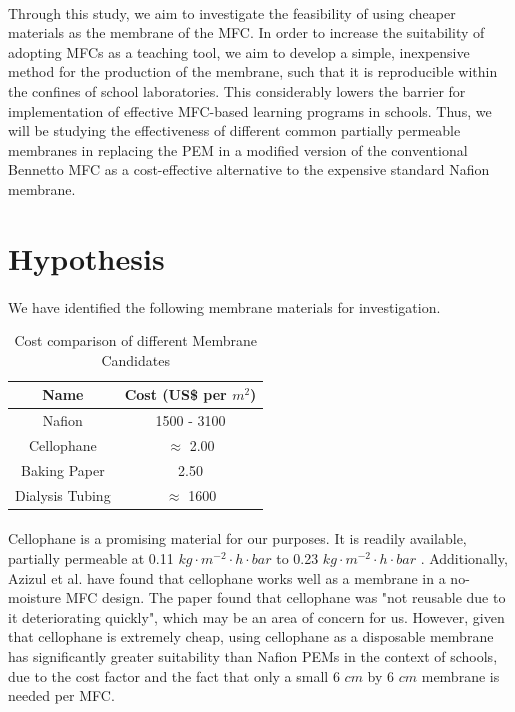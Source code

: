 \documentclass[12pt, twocolumn, a4paper]{article}
\begin{document}
\paragraph{}Through this study, we aim to investigate the feasibility of using cheaper materials as the membrane of the MFC. In order to increase the suitability of adopting MFCs as a teaching tool, we aim to develop a simple, inexpensive method for the production of the membrane, such that it is reproducible within the confines of school laboratories. This considerably lowers the barrier for implementation of effective MFC-based learning programs in schools. Thus, we will be studying the effectiveness of different common partially permeable membranes in replacing the PEM in a modified version of the conventional Bennetto MFC as a cost-effective alternative to the expensive standard Nafion\texttrademark{} membrane.
\section{Hypothesis}
\paragraph{}We have identified the following membrane materials for investigation. 
        \begin{center}
        \begin{table}[h]
        \begin{tabular}[H]{ |c|c| } 
         \hline
         {\small\textbf{Name}} & {\small\textbf{Cost}} {\footnotesize(US\$ per $m^2$)}\\
             \hline
             {\small Nafion} & {\small 1500 - 3100}\\
             {\small Cellophane} & $\approx$ {\small 2.00}\\
             {\small Baking Paper} & {\small 2.50}\\
             {\small Dialysis Tubing} & {\small$\approx$ 1600}\\
         \hline
         
        \end{tabular}
        \caption{Cost comparison of different Membrane Candidates}
        \end{table}
        \end{center}
    \paragraph{}Cellophane is a promising material for our purposes. It is readily available, partially permeable at 0.11 $kg\cdot m^{-2} \cdot h\cdot bar$ to 0.23 $kg\cdot m^{-2} \cdot h\cdot bar$ \cite{Makarov2022}. Additionally, Azizul et al. have found that cellophane works well as a membrane in a no-moisture MFC design. \cite{MOQSUD20132465} The paper found that cellophane was "not reusable due to it deteriorating quickly", which may be an area of concern for us. However, given that cellophane is extremely cheap, using cellophane as a disposable membrane has significantly greater suitability than Nafion\texttrademark{} PEMs in the context of schools, due to the cost factor and the fact that only a small 6 $cm$ by 6 $cm$ membrane is needed per MFC.
    
\end{document}
